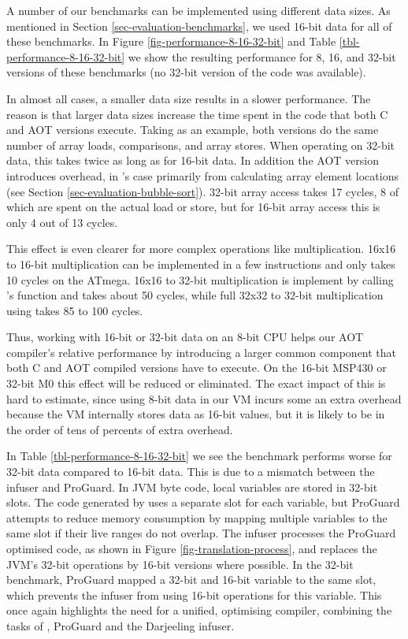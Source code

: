 A number of our benchmarks can be implemented using different data sizes. As mentioned in Section \ref{sec-evaluation-benchmarks}, we used 16-bit data for all of these benchmarks. In Figure \ref{fig-performance-8-16-32-bit} and Table \ref{tbl-performance-8-16-32-bit} we show the resulting performance for 8, 16, and 32-bit versions of these benchmarks (no 32-bit version of the  code was available).

In almost all cases, a smaller data size results in a slower performance. The reason is that larger data sizes increase the time spent in the code that both C and AOT versions execute. Taking  as an example, both versions do the same number of array loads, comparisons, and array stores. When operating on 32-bit data, this takes twice as long as for 16-bit data. In addition the AOT version introduces overhead, in 's case primarily from calculating array element locations (see Section \ref{sec-evaluation-bubble-sort}). 32-bit array access takes 17 cycles, 8 of which are spent on the actual load or store, but for 16-bit array access this is only 4 out of 13 cycles.

This effect is even clearer for more complex operations like multiplication. 16x16 to 16-bit multiplication can be implemented in a few instructions and only takes 10 cycles on the ATmega. 16x16 to 32-bit multiplication is implement by calling 's  function and takes about 50 cycles, while full 32x32 to 32-bit multiplication using  takes 85 to 100 cycles.

Thus, working with 16-bit or 32-bit data on an 8-bit CPU helps our AOT compiler's relative performance by introducing a larger common component that both C and AOT compiled versions have to execute. On the 16-bit MSP430 or 32-bit M0 this effect will be reduced or eliminated. The exact impact of this is hard to estimate, since using 8-bit data in our VM incurs some an extra overhead because the VM internally stores data as 16-bit values, but it is likely to be in the order of tens of percents of extra overhead.

In Table \ref{tbl-performance-8-16-32-bit} we see the  benchmark performs worse for 32-bit data compared to 16-bit data. This is due to a mismatch between the infuser and ProGuard. In JVM byte code, local variables are stored in 32-bit slots. The code generated by  uses a separate slot for each variable, but ProGuard attempts to reduce memory consumption by mapping multiple variables to the same slot if their live ranges do not overlap. The infuser processes the ProGuard optimised code, as shown in Figure \ref{fig-translation-process}, and replaces the JVM's 32-bit operations by 16-bit versions where possible. In the 32-bit  benchmark, ProGuard mapped a 32-bit and 16-bit variable to the same slot, which prevents the infuser from using 16-bit operations for this variable. This once again highlights the need for a unified, optimising compiler, combining the tasks of , ProGuard and the Darjeeling infuser.

